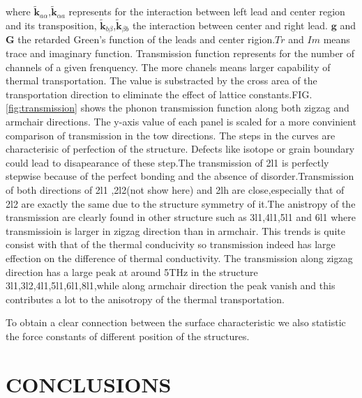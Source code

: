\documentclass[%
 reprint,
 amsmath,amssymb,
 aps,
 prb,
]{revtex4-1}
\begin{document}
where $\mathbf{\widetilde{k}}_{a\alpha}$,$\mathbf{\widetilde{k}}_{\alpha a}$ represents for the interaction between left lead and center region and its transposition,  $\mathbf{\widetilde{k}}_{b\beta}$,$\mathbf{\widetilde{k}}_{\beta b}$ the interaction between center and right lead. $\mathbf{g}$ and $\mathbf{G}$ the retarded Green's function of the leads and center rigion.$Tr$ and $Im$ means trace and imaginary function. Transmission function represents for the number of channels of a given frenquency. The more chanels means larger capability of thermal transportation. The value is substracted by the cross area of the transportation direction to eliminate the effect of lattice constants.FIG.\ref{fig:transmission} shows the phonon transmission function along both zigzag and armchair directions. The y-axis value of each panel is scaled for a more convinient comparison of transmission in the tow directions. The steps in the curves are  characterisic of perfection of the structure. Defects like isotope or grain boundary could lead to disapearance of these step.The transmission of  2l1 is perfectly stepwise because of the perfect bonding and the absence of disorder.Transmission of both directions of 2l1 ,2l2(not show here) and 2lh are close,especially that of 2l2 are exactly the same due to the structure symmetry of it.The anistropy of the transmission are clearly found in other structure such as 3l1,4l1,5l1 and 6l1 where transmissioin is larger in zigzag direction than in armchair. This trends is quite consist with that of the thermal conducivity so transmission indeed has large effection on the difference of thermal conductivity. The transmission along zigzag direction has a large peak at around 5THz in the structure 3l1,3l2,4l1,5l1,6l1,8l1,while along armchair direction the peak vanish and this contributes a lot to the anisotropy of the thermal transportation.


To obtain a clear connection between  the surface characteristic we also statistic the force constants of different position of the structures.



\section{CONCLUSIONS}
\end{document}

